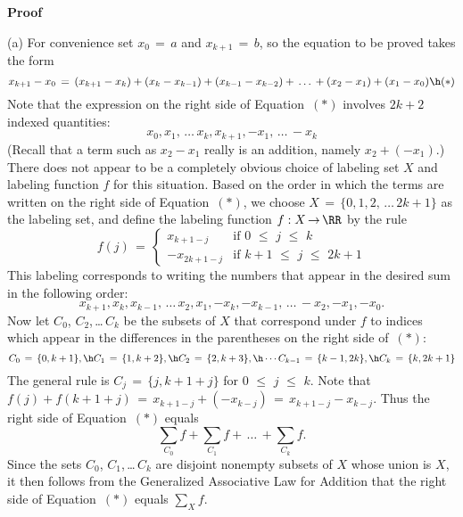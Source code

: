 {\V

        {\bf Proof}

\V

        (a) For convenience set $x_{0} \,=\, a$ and $x_{k+1} \,=\, b$, so the equation to be proved takes the form
        \begin{displaymath}
        x_{k+1}-x_{0} \,=\, (x_{k+1}-x_{k}) + (x_{k}-x_{k-1}) + (x_{k-1}-x_{k-2}) + \,{\ldots}\, + (x_{2}-x_{1}) + (x_{1}-x_{0}) \h ({\ast})
        \end{displaymath}
    Note that the expression on the right side of Equation~$({\ast})$ involves $2k+2$ indexed quantities:
        \begin{displaymath}
        x_{0}, x_{1},\,{\ldots}\,x_{k},x_{k+1}, -x_{1},\,{\ldots}\,-x_{k}
        \end{displaymath}
    (Recall that a term such as $x_{2}-x_{1}$ really is an addition, namely $x_{2} + (-x_{1})$.)
    There does not appear to be a completely obvious choice of labeling set $X$ and labeling function $f$ for this situation.
    Based on the order in which the terms are written on the right side of Equation~$({\ast})$,
    we choose $X \,=\, \{0,1,2,\,{\ldots}\,2k+1\}$ as the labeling set, and define the labeling function $f:X \,{\rightarrow}\, {\RR}$ by the rule
        \begin{displaymath}
        f(j) \,=\, \left\{
        \begin{array}{rl}
        x_{k+1-j} & \mbox{if $0\,\,{\leq}\,\,j\,\,{\leq}\,\,k$} \\
       -x_{2k+1-j} & \mbox{if $k+1\,\,{\leq}\,\,j\,\,{\leq}\,\,2k+1$}
        \end{array}
                            \right.
        \end{displaymath}
    This labeling corresponds to writing the numbers that appear in the desired sum in the following order:
        \begin{displaymath}
        x_{k+1}, x_{k}, x_{k-1},\,{\ldots}\,x_{2},x_{1}, -x_{k}, -x_{k-1},\,{\ldots}\,-x_{2}, -x_{1}, -x_{0}.
        \end{displaymath}
    Now let $C_{0}$, $C_{2}$,\,{\ldots}\,$C_{k}$ be the subsets of $X$ that correspond under $f$ to indices which appear in the differences in the parentheses on the right side of~$({\ast})$:
        \begin{displaymath}
        C_{0} \,=\, \{0,k+1\}, \h C_{1} \,=\, \{1,k+2\}, \h C_{2} \,=\, \{2, k+3\}, \h  \,{\cdots}\, C_{k-1} \,=\, \{k-1, 2k\}, \h C_{k}  \,=\, \{k,2k+1\}
        \end{displaymath}
    The general rule is $C_{j} \,=\, \{j, k+1+j\}$ for $0\,\,{\leq}\,\,j\,\,{\leq}\,\,k$.
    Note that $f(j) + f(k+1+j) \,=\, x_{k+1-j} + (-x_{k-j}) \,=\, x_{k+1-j}-x_{k-j}$.
    Thus the right side of Equation~$({\ast})$ equals
        \begin{displaymath}
        {\sum}_{C_{0}} f + {\sum}_{C_{1}} f + \,{\ldots}\, + {\sum}_{C_{k}} f.
        \end{displaymath}
    Since the sets $C_{0}$, $C_{1}$,\,{\ldots}\,$C_{k}$ are disjoint nonempty subsets of $X$ whose union is $X$, it then follows from the Generalized Associative Law for Addition that the right side of Equation~$({\ast})$ equals ${\sum}_{X} f$.

}
